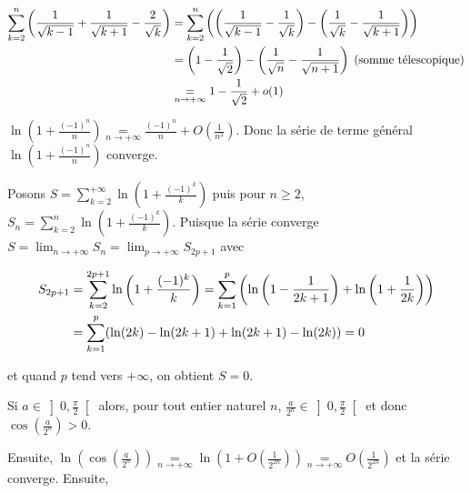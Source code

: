 {{\begin{center}
\end{center}
\begin{align*}\ensuremath
\sum_{k=2}^{n}\left(\frac{1}{\sqrt{k-1}}+\frac{1}{\sqrt{k+1}}-\frac{2}{\sqrt{k}}\right)&=\sum_{k=2}^{n}\left(\left(\frac{1}{\sqrt{k-1}}-\frac{1}{\sqrt{k}}\right)-\left(\frac{1}{\sqrt{k}}-\frac{1}{\sqrt{k+1}}\right)\right)\\
 &=\left(1-\frac{1}{\sqrt{2}}\right)-\left(\frac{1}{\sqrt{n}}-\frac{1}{\sqrt{n+1}}\right)\;(\text{somme télescopique})\\
 &\underset{n\rightarrow+\infty}{=}1-\frac{1}{\sqrt{2}}+o(1) 
\end{align*}

\begin{center}
\end{center}
$\ln\left(1+\frac{(-1)^n}{n}\right)\underset{n\rightarrow+\infty}{=}\frac{(-1)^n}{n}+O\left(\frac{1}{n^2}\right)$. Donc la série de terme général $\ln\left(1+\frac{(-1)^n}{n}\right)$ converge.

Posons $S=\sum_{k=2}^{+\infty}\ln\left(1+\frac{(-1)^k}{k}\right)$ puis pour $n\geqslant2$, $S_n=\sum_{k=2}^{n}\ln\left(1+\frac{(-1)^k}{k}\right)$. Puisque la série converge $S=\lim_{n \rightarrow +\infty}S_n=\lim_{p \rightarrow +\infty}S_{2p+1}$ avec

\begin{align*}\ensuremath
S_{2p+1}&=\sum_{k=2}^{2p+1}\ln\left(1+\frac{(-1)^k}{k}\right)=\sum_{k=1}^{p}\left(\ln\left(1-\frac{1}{2k+1}\right)+\ln\left(1+\frac{1}{2k}\right)\right)\\
 &=\sum_{k=1}^{p}(\ln(2k)-\ln(2k+1)+\ln(2k+1)-\ln(2k))=0
\end{align*}

et quand $p$ tend vers $+\infty$, on obtient $S = 0$.

\begin{center}
\end{center}
Si $a\in\left]0,\frac{\pi}{2}\right[$ alors, pour tout entier naturel $n$, $\frac{a}{2^n}\in\left]0,\frac{\pi}{2}\right[$ et donc $\cos\left(\frac{a}{2^n}\right)>0$.

Ensuite, $\ln\left(\cos\left(\frac{a}{2^n}\right)\right)\underset{n\rightarrow+\infty}{=}\ln\left(1+O\left(\frac{1}{2^{2n}}\right)\right)\underset{n\rightarrow+\infty}{=}O\left(\frac{1}{2^{2n}}\right)$ et la série converge. Ensuite,

}}
